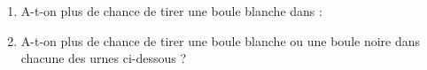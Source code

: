 \begin{pageAuto}
 
\ExoAuto
 

 \begin{enumerate}
\item A-t-on plus de chance de tirer une boule blanche dans :
\item A-t-on plus de chance de tirer une boule blanche ou une boule noire dans chacune  
des urnes ci-dessous ?
\end{enumerate}



\end{pageAuto}
